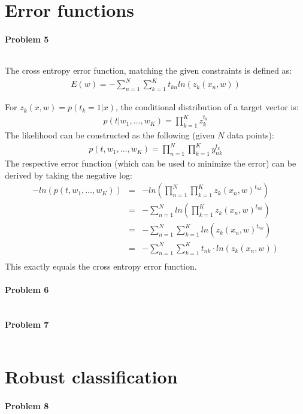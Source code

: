 \documentclass{article}
\begin{document}
\section{Error functions}

\paragraph*{Problem 5}
$\;$

The cross entropy error function, matching the given constraints is defined as:
\begin{eqnarray}
E(w) = - \sum_{n=1}^N \sum_{k=1}^K t_{kn} ln(z_k(x_n,w))
\end{eqnarray}

For $z_k(x,w) = p(t_k = 1 | x)$, the conditional distribution of a target vector is:
\begin{eqnarray}
p(t | w_1, \dots, w_K) = \prod_{k=1}^K z_k^{t_k}
\end{eqnarray}
The likelihood can be constructed as the following (given $N$ data points):
\begin{eqnarray}
p(t,w_1,\dots,w_K) = \prod_{n=1}^N \prod_{k=1}^K y_{nk}^{t_k}
\end{eqnarray}
The respective error function (which can be used to minimize the error) can be derived by taking the negative log:
\begin{eqnarray}
-ln (p(t,w_1,\dots,w_K)) &=& -ln(\prod_{n=1}^N \prod_{k=1}^K z_k(x_n,w)^{t_{nk}}) \\
&=& -\sum_{n=1}^N ln(\prod_{k=1}^K z_k(x_n,w)^{t_{nk}})\\
&=& -\sum_{n=1}^N \sum_{k=1}^K ln(z_k(x_n,w)^{t_{nk}}) \\
&=& -\sum_{n=1}^N \sum_{k=1}^K t_{nk} \cdot ln(z_k(x_n,w)) \\
\end{eqnarray}
This exactly equals the cross entropy error function.

\paragraph*{Problem 6}
$\;$ 

\paragraph*{Problem 7}
$\;$ 

\section{Robust classification}

\paragraph*{Problem 8}
$\;$ 
\end{document}
